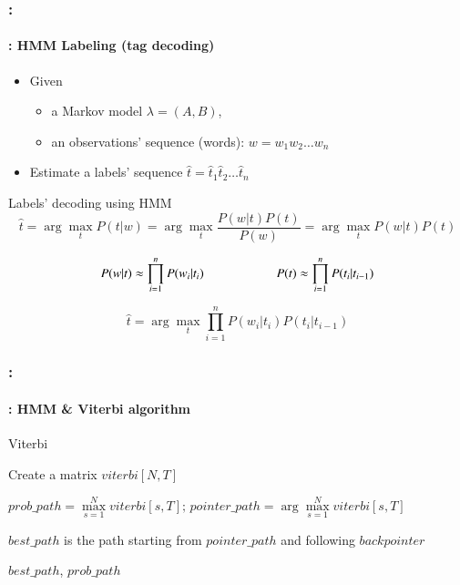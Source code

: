 \documentclass[xcolor=table]{beamer}
\begin{document}
\begin{frame}
	\frametitle{\insertshortsubtitle: \insertsection}
	\framesubtitle{\insertsubsection: HMM Labeling (tag decoding)}
	
	\begin{itemize}
			\item Given
			\begin{itemize}
					\item a Markov model $\lambda = (A, B)$,
					\item an observations' sequence (words): $w = w_1 w_2 \ldots w_n$
				\end{itemize}
			\item Estimate a labels' sequence $\hat{t} = \hat{t}_1 \hat{t}_2 \ldots \hat{t}_n$
		\end{itemize}
	
	\begin{block}{Labels' decoding using HMM}
			\[
			\hat{t} = \arg\max\limits_t P(t | w) = \arg\max\limits_t \frac{P(w|t) P(t)}{P(w)} = \arg\max\limits_t P(w|t) P(t)%
			\]
			
			\[ 
			P(w | t) \approx \prod\limits_{i=1}^n P(w_i|t_i) 
			\hskip2cm
			P(t) \approx \prod\limits_{i=1}^n P(t_i|t_{i-1}) 
			\]
			
			\[
			\hat{t} = \arg\max\limits_t \prod\limits_{i=1}^n P(w_i|t_i) P(t_i|t_{i-1})
			\]
		\end{block}
\end{frame}

\begin{frame}
	\frametitle{\insertshortsubtitle: \insertsection}
	\framesubtitle{\insertsubsection: HMM \& Viterbi algorithm}
	
	\begin{block}{Viterbi}
			\scriptsize
			\begin{algorithm}[H]
					
					Create a matrix $viterbi[N, T]$\;
					
					
					
					$prob\_path = \max\limits_{s=1}^N viterbi[s, T];\, pointer\_path = \arg\max\limits_{s=1}^N viterbi[s, T]$\;
					
					$best\_path$ is the path starting from $pointer\_path$ and following $backpointer$
					
					\Return $best\_path$, $prob\_path$\;
					
				\end{algorithm}
		\end{block}
	
\end{frame}
\end{document}
